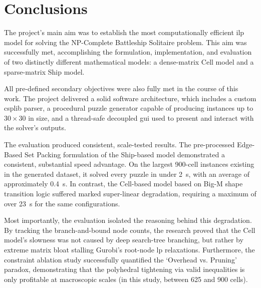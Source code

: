 %


\section{Conclusions}\label{sec:conclusions}
The project's main aim was to establish the most computationally efficient \gls{ilp} model for solving the NP-Complete Battleship Solitaire problem. This aim was successfully met, accomplishing the formulation, implementation, and evaluation of two distinctly different mathematical models: a dense-matrix Cell model and a sparse-matrix Ship model.

All pre-defined secondary objectives were also fully met in the course of this work. The project delivered a solid software architecture, which includes a custom \gls{csplib} parser, a procedural puzzle generator capable of producing instances up to $30 \times 30$ in size, and a thread-safe decoupled \gls{gui} used to present and interact with the solver's outputs.

The evaluation produced consistent, scale-tested results. The pre-processed Edge-Based Set Packing formulation of the Ship-based model demonstrated a consistent, substantial speed advantage. On the largest \num{900}-cell instances existing in the generated dataset, it solved every puzzle in under \SI{2}{\second}, with an average of approximately \SI{0.4}{\second}. In contrast, the Cell-based model based on Big-M shape transition logic suffered marked super-linear degradation, requiring a maximum of over \SI{23}{\second} for the same configurations.

Most importantly, the evaluation isolated the reasoning behind this degradation. By tracking the branch-and-bound node counts, the research proved that the Cell model's slowness was not caused by deep search-tree branching, but rather by extreme matrix bloat stalling Gurobi's root-node \gls{lp} relaxations. Furthermore, the constraint ablation study successfully quantified the `Overhead vs. Pruning' paradox, demonstrating that the polyhedral tightening via valid inequalities is only profitable at macroscopic scales (in this study, between 625 and 900 cells). 

